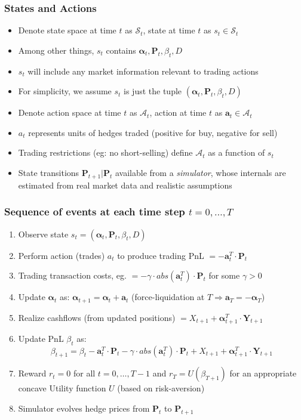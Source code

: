 \documentclass[handout]{beamer}
\begin{document}
\begin{frame}
\frametitle{States and Actions}
\pause
\begin{itemize}[<+->]
\item Denote state space at time $t$ as $\mathcal{S}_t$, state at time $t$ as $s_t \in \mathcal{S}_t$
\item Among other things, $s_t$ contains $\bm{\alpha}_t, \bm{P}_t, \beta_t, D$
\item $s_t$ will include any market information relevant to trading actions
\item For simplicity, we assume $s_t$ is just the tuple $(\bm{\alpha}_t, \bm{P}_t, \beta_t, D)$
\item Denote action space at time $t$ as $\mathcal{A}_t$, action at time $t$ as $\bm{a}_t \in \mathcal{A}_t$
\item $a_t$ represents units of hedges traded (positive for buy, negative for sell)
\item Trading restrictions (eg: no short-selling) define $\mathcal{A}_t$ as a function of $s_t$
\item State transitions $\bm{P}_{t+1}|\bm{P}_t$ available from a {\em simulator}, whose internals are estimated from real market data and realistic assumptions
\end{itemize}
\end{frame}

\begin{frame}
\frametitle{Sequence of events at each time step $t=0, \ldots, T$}
\pause
\begin{enumerate}[<+->]
\item Observe state $s_t = (\bm{\alpha}_t, \bm{P}_t, \beta_t, D)$
\item Perform action (trades) $a_t$ to produce trading PnL $= - \bm{a}_t^T \cdot \bm{P}_t$
\item Trading transaction costs, eg. $= - \gamma \cdot abs(\bm{a}_t^T) \cdot \bm{P}_t$ for some $\gamma > 0$
\item Update $\bm{\alpha}_t$ as: $\bm{\alpha}_{t+1} = \bm{\alpha}_t + \bm{a}_t$ (force-liquidation at $T \Rightarrow \bm{a}_T= -\bm{\alpha}_T$)
\item Realize cashflows (from updated positions) $=X_{t+1} + \bm{\alpha}_{t+1}^T \cdot \bm{Y}_{t+1}$
\item Update PnL $\beta_t$ as:
$$\beta_{t+1} = \beta_t - \bm{a}_t^T \cdot \bm{P}_t - \gamma \cdot abs(\bm{a}_t^T) \cdot \bm{P}_t + X_{t+1} + \bm{\alpha}_{t+1}^T \cdot \bm{Y}_{t+1}$$
\item Reward $r_t = 0$ for all $t = 0, \ldots, T-1$ and $r_T = U(\beta_{T+1})$ for an appropriate concave Utility function $U$ (based on risk-aversion)
\item Simulator evolves hedge prices from $\bm{P}_t$ to $\bm{P}_{t+1}$
\end{enumerate}
\end{frame}
\end{document}
